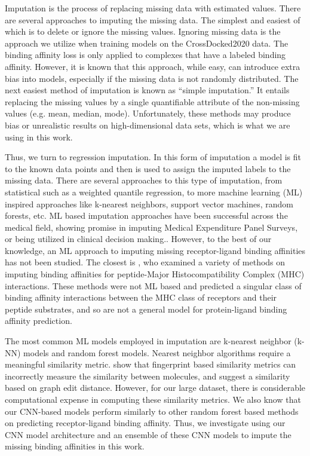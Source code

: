 \documentclass[journal=jmcmar,manuscript=article]{achemso}
\begin{document}
Imputation is the process of replacing missing data with estimated values.\cite{surveyReview1, review2}
There are several approaches to imputing the missing data.
The simplest and easiest of which is to delete or ignore the missing values.
Ignoring missing data is the approach we utilize when training models on the CrossDocked2020 data.\cite{crossdocked2020}  The binding affinity loss is only applied to complexes that have a labeled binding affinity.
However, it is known that this approach, while easy, can introduce extra bias into  models, especially if the missing data is not randomly distributed.\cite{rev1support}
The next easiest method of imputation is known as ``simple imputation.''
It entails replacing the missing values by a single quantifiable attribute of the non-missing values (e.g. mean, median, mode).
Unfortunately, these methods may produce bias or unrealistic results on high-dimensional data sets, which is what we are using in this work. \cite{SICE}

Thus, we turn to regression imputation.
In this form of imputation a model is fit to the known data points and then is used to assign the imputed labels to the missing data.
There are several approaches to this type of imputation, from statistical such as a weighted quantile regression, to more machine learning (ML) inspired approaches like k-nearest neighbors, support vector machines, random forests, etc.\cite{rev1support,review2}
ML based imputation approaches have been successful across the medical field, showing promise in imputing Medical Expenditure Panel Surveys\cite{MLimpMedsurvey}, or being utilized in clinical decision making.\cite{MLclinicDecision}.
However, to the best of our knowledge, an ML approach to imputing missing receptor-ligand binding affinities has not been studied.
The closest is \citet{peptideMHCimp}, who examined a variety of methods on imputing binding affinities for peptide-Major Histocompatibility Complex (MHC) interactions.
These methods were not ML based and predicted a singular class of binding affinity interactions between the MHC class of receptors and their peptide substrates,\cite{peptideMHCimp} and so are not a general model for protein-ligand binding affinity prediction.

The most common ML models employed in imputation are k-nearest neighbor (k-NN) models and random forest models.\cite{review2}  Nearest neighbor algorithms require a meaningful similarity metric.
 \citet{graphEditDist} show that fingerprint based similarity metrics can incorrectly measure the similarity between molecules, and suggest a similarity based on graph edit distance.
However, for our large dataset, there is considerable computational expense in computing these similarity metrics. 
We also know that our CNN-based models perform similarly to other random forest based methods on predicting receptor-ligand binding affinity.\cite{crossdocked2020}
Thus, we investigate using our CNN model architecture and an ensemble of these CNN models to impute the missing binding affinities in this work.
\end{document}
